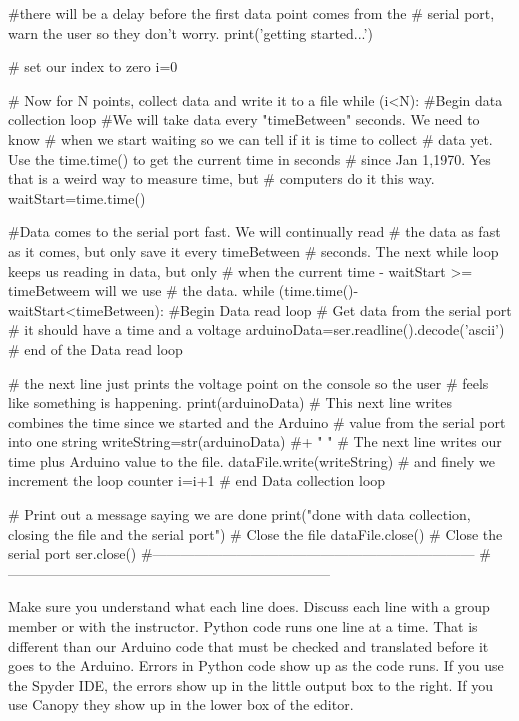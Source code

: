 \begin{python}
#there will be a delay before the first data point comes from the 
#  serial port, warn the user so they don't worry.
print('getting started...')
 
# set our index to zero
i=0
 
 
# Now for N points, collect data and write it to a file
while (i<N):    #Begin data collection loop
    #We will take data every "timeBetween" seconds. We need to know 
    #   when we start waiting so we can tell if it is time to collect 
    #   data yet. Use the time.time() to get the current time in seconds
    #   since Jan 1,1970. Yes that is a weird way to measure time, but 
    #   computers do it this way.
    waitStart=time.time()
    
    #Data comes to the serial port fast. We will continually read 
    #  the data as fast as it comes, but only save it every timeBetween
    #  seconds. The next while loop keeps us reading in data, but only 
    #  when the current time - waitStart >= timeBetweem will we use 
    #  the data.
    while (time.time()-waitStart<timeBetween): #Begin Data read loop
         # Get data from the serial port
         # it should have a time and a voltage
         arduinoData=ser.readline().decode('ascii')
         # end of the Data read loop
         
    # the next line just prints the voltage point on the console so the user 
    # feels like something is happening.
    print(arduinoData)
    # This next line writes combines the time since we started and the Arduino 
    # value from the serial port into one string
    writeString=str(arduinoData) #+ " \n"
    # The next line writes our time plus Arduino value to the file.
    dataFile.write(writeString)
    # and finely we increment the loop counter
    i=i+1      # end Data collection loop   
    
# Print out a message saying we are done
print("done with data collection, closing the file and the serial port")
# Close the file
dataFile.close()
# Close the serial port   
ser.close() 
#---------------------------------------------------------------------
#---------------------------------------------------------------------
\end{python}

Make sure you understand what each line does. Discuss each line with a group
member or with the instructor. Python code runs one line at a time. That is
different than our Arduino code that must be checked and translated before
it goes to the Arduino. Errors in Python code show up as the code runs. If
you use the Spyder IDE, the errors show up in the little output box to the
right. If you use Canopy they show up in the lower box of the editor.

